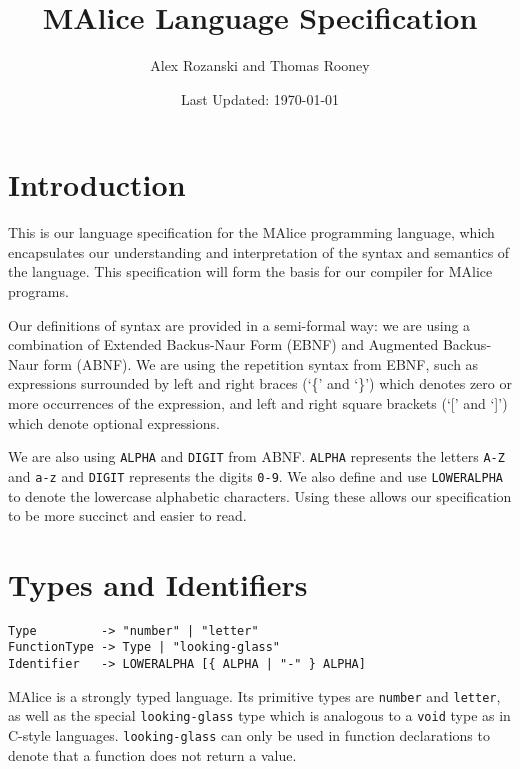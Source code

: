 \documentclass[a4wide, 11pt]{article}
\begin{document}
\title{MAlice Language Specification}

\author{Alex Rozanski and Thomas Rooney}

\date{Last Updated: \today}         %

\maketitle            %

\section{Introduction}

This is our language specification for the MAlice programming language, which encapsulates our understanding and interpretation of the syntax and semantics of the language. This specification will form the basis for our compiler for MAlice programs.

Our definitions of syntax are provided in a semi-formal way: we are using a combination of Extended Backus-Naur Form (EBNF) and Augmented Backus-Naur form (ABNF). We are using the repetition syntax from EBNF, such as expressions surrounded by left and right braces (`\{' and `\}') which denotes zero or more occurrences of the expression, and left and right square brackets (`[' and `]') which denote optional expressions.

We are also using \texttt{ALPHA} and \texttt{DIGIT} from ABNF. \texttt{ALPHA} represents the letters \texttt{A-Z} and \texttt{a-z} and \texttt{DIGIT} represents the digits \texttt{0-9}. We also define and use \texttt{LOWERALPHA} to denote the lowercase alphabetic characters. Using these allows our specification to be more succinct and easier to read.

\section{Types and Identifiers}

\begin{verbatim}
Type         -> "number" | "letter"
FunctionType -> Type | "looking-glass"
Identifier   -> LOWERALPHA [{ ALPHA | "-" } ALPHA]
\end{verbatim}

MAlice is a strongly typed language. Its primitive types are \texttt{number} and \texttt{letter}, as well as the special \texttt{looking-glass} type which is analogous to a \texttt{void} type as in C-style languages. \texttt{looking-glass} can only be used in function declarations to denote that a function does not return a value.
\end{document}
